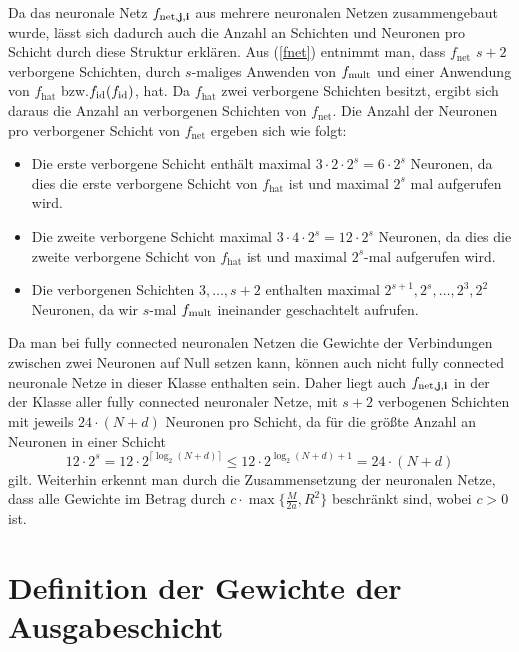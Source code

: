Da das neuronale Netz $f_{\mathrm{net},\mathbf{j},\mathbf{i}}$ aus mehrere neuronalen Netzen zusammengebaut wurde, lässt sich dadurch auch die Anzahl an Schichten und Neuronen pro Schicht durch diese Struktur erklären. Aus (\ref{fnet}) entnimmt man, dass $f_{\mathrm{net}}$ $s + 2$ verborgene Schichten, durch $s$-maliges Anwenden von $f_{\mathrm{mult}}$ und einer Anwendung von $f_{\mathrm{hat}}$ bzw.\@ $f_{\mathrm{id}}(f_{\mathrm{id}})$, hat. Da $f_{\mathrm{hat}}$ zwei verborgene Schichten besitzt, ergibt sich daraus die Anzahl an verborgenen Schichten von $f_{\mathrm{net}}$.
Die Anzahl der Neuronen pro verborgener Schicht von $f_{\mathrm{net}}$ ergeben sich wie folgt:
\begin{itemize}
\item Die erste verborgene Schicht enthält maximal $3 \cdot 2 \cdot 2^s = 6 \cdot 2^s$ Neuronen, da dies die erste verborgene Schicht von $f_{\mathrm{hat}}$ ist und maximal $2^s$ mal aufgerufen wird. 
\item Die zweite verborgene Schicht maximal $3 \cdot 4 \cdot 2^s = 12\cdot 2^s$ Neuronen, da dies die zweite verborgene Schicht von $f_{\mathrm{hat}}$ ist und maximal $2^s$-mal aufgerufen wird.
\item Die verborgenen Schichten $3,\dots,s + 2$ enthalten maximal   $2^{s+ 1}, 2^s, \dots, 2^3, 2^2$ Neuronen, da wir $s$-mal $f_{\mathrm{mult}}$ ineinander geschachtelt aufrufen. 
\end{itemize}  
Da man bei fully connected neuronalen Netzen die Gewichte der Verbindungen zwischen zwei Neuronen auf Null setzen kann, können auch nicht fully connected neuronale Netze in dieser Klasse enthalten sein. Daher liegt auch $f_{\mathrm{net},\mathbf{j},\mathbf{i}}$ in der der Klasse aller fully connected neuronaler Netze, mit $s + 2$ verbogenen Schichten mit jeweils $24 \cdot (N + d)$ Neuronen pro Schicht, da für die größte Anzahl an Neuronen in einer Schicht $$12 \cdot 2^s = 12 \cdot 2^{\lceil\log_2(N + d)\rceil} \leq 12 \cdot 2^{\log_2(N + d) + 1} = 24 \cdot (N + d)$$ gilt. Weiterhin erkennt man durch die Zusammensetzung der neuronalen Netze, dass alle Gewichte im Betrag durch $c \cdot \max\{\frac{M}{2a}, R^2\}$ beschränkt sind, wobei $c > 0$ ist. 

\section{Definition der Gewichte der Ausgabeschicht}
\label{subsec:2.2}

